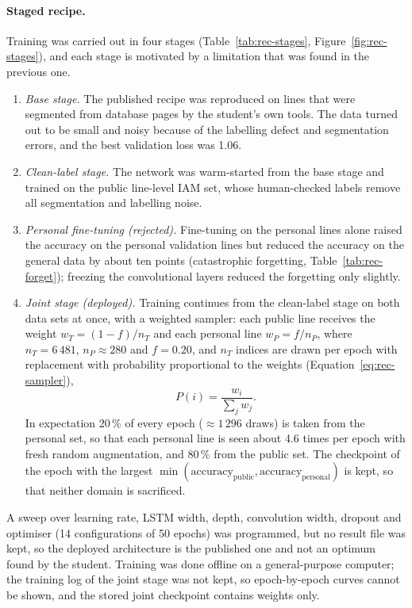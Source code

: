 \paragraph{Staged recipe.}
Training was carried out in four stages (Table~\ref{tab:rec-stages}, Figure~\ref{fig:rec-stages}), and each stage is motivated by a limitation that was found in the previous one.
\begin{enumerate}
\item \emph{Base stage.} The published recipe was reproduced on lines that were segmented from database pages by the student's own tools. The data turned out to be small and noisy because of the labelling defect and segmentation errors, and the best validation loss was 1.06.
\item \emph{Clean-label stage.} The network was warm-started from the base stage and trained on the public line-level IAM set, whose human-checked labels remove all segmentation and labelling noise.
\item \emph{Personal fine-tuning (rejected).} Fine-tuning on the personal lines alone raised the accuracy on the personal validation lines but reduced the accuracy on the general data by about ten points (catastrophic forgetting, Table~\ref{tab:rec-forget}); freezing the convolutional layers reduced the forgetting only slightly.
\item \emph{Joint stage (deployed).} Training continues from the clean-label stage on both data sets at once, with a weighted sampler: each public line receives the weight $w_T=(1-f)/n_T$ and each personal line $w_P=f/n_P$, where $n_T=6\,481$, $n_P\approx280$ and $f=0.20$, and $n_T$ indices are drawn per epoch with replacement with probability proportional to the weights (Equation~\ref{eq:rec-sampler}),
\begin{equation}
P(i)=\frac{w_i}{\sum_jw_j}.
\label{eq:rec-sampler}
\end{equation}
In expectation 20\,\% of every epoch ($\approx1\,296$ draws) is taken from the personal set, so that each personal line is seen about 4.6 times per epoch with fresh random augmentation, and 80\,\% from the public set. The checkpoint of the epoch with the largest $\min(\text{accuracy}_{\mathrm{public}},\text{accuracy}_{\mathrm{personal}})$ is kept, so that neither domain is sacrificed.
\end{enumerate}



A sweep over learning rate, LSTM width, depth, convolution width, dropout and optimiser (14 configurations of 50 epochs) was programmed, but no result file was kept, so the deployed architecture is the published one and not an optimum found by the student.
Training was done offline on a general-purpose computer; the training log of the joint stage was not kept, so epoch-by-epoch curves cannot be shown, and the stored joint checkpoint contains weights only.


